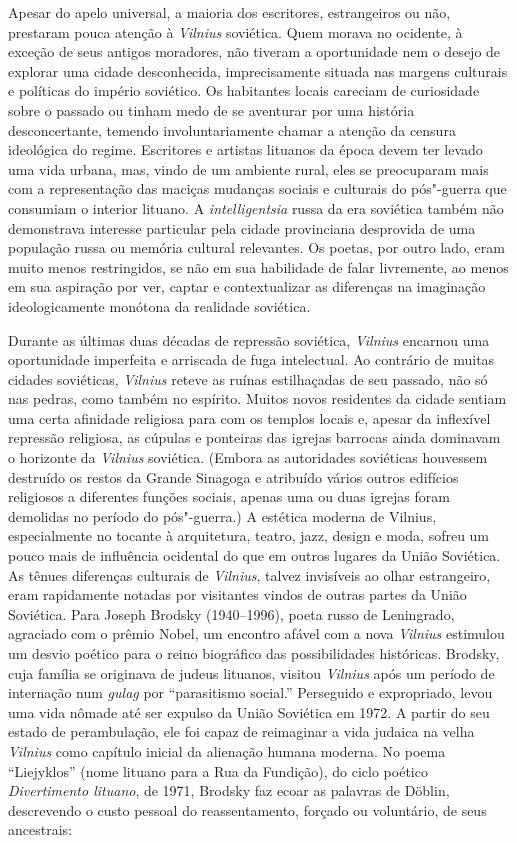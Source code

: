 Apesar do apelo universal, a maioria dos escritores, estrangeiros ou
não, prestaram pouca atenção à \textit{Vilnius} soviética. Quem morava no
ocidente, à exceção de seus antigos moradores, não tiveram a
oportunidade nem o desejo de explorar uma cidade desconhecida,
imprecisamente situada nas margens culturais e políticas do império
soviético. Os habitantes locais careciam de curiosidade sobre o passado
ou tinham medo de se aventurar por uma história desconcertante, temendo
involuntariamente chamar a atenção da censura ideológica do regime.
Escritores e artistas lituanos da época devem ter levado uma vida
urbana, mas, vindo de um ambiente rural, eles se preocuparam mais com a
representação das maciças mudanças sociais e culturais do pós"-guerra que
consumiam o interior lituano. A \textit{intelligentsia} russa da era
soviética também não demonstrava interesse particular pela cidade
provinciana desprovida de uma população russa ou memória cultural
relevantes. Os poetas, por outro lado, eram muito menos restringidos, se
não em sua habilidade de falar livremente, ao menos em sua aspiração por
ver, captar e contextualizar as diferenças na imaginação ideologicamente
monótona da realidade soviética.

Durante as últimas duas décadas de repressão soviética, \textit{Vilnius} encarnou
uma oportunidade imperfeita e arriscada de fuga intelectual. Ao
contrário de muitas cidades soviéticas, \textit{Vilnius} reteve as ruínas
estilhaçadas de seu passado, não só nas pedras, como também no espírito.
Muitos novos residentes da cidade sentiam uma certa afinidade religiosa
para com os templos locais e, apesar da inflexível repressão religiosa,
as cúpulas e ponteiras das igrejas barrocas ainda dominavam o horizonte
da \textit{Vilnius} soviética. (Embora as autoridades soviéticas houvessem
destruído os restos da Grande Sinagoga e atribuído vários outros
edifícios religiosos a diferentes funções sociais, apenas uma ou duas
igrejas foram demolidas no período do pós"-guerra.) A estética moderna de
Vilnius, especialmente no tocante à arquitetura, teatro, jazz, design e
moda, sofreu um pouco mais de influência ocidental do que em outros
lugares da União Soviética. As tênues diferenças culturais de \textit{Vilnius},
talvez invisíveis ao olhar estrangeiro, eram rapidamente notadas por
visitantes vindos de outras partes da União Soviética. Para Joseph
Brodsky (1940--1996), poeta russo de Leningrado, agraciado com o prêmio
Nobel, um encontro afável com a nova \textit{Vilnius} estimulou um desvio poético
para o reino biográfico das possibilidades históricas. Brodsky, cuja
família se originava de judeus lituanos, visitou \textit{Vilnius} após um período
de internação num \textit{gulag} por ``parasitismo social.'' Perseguido e
expropriado, levou uma vida nômade até ser expulso da União Soviética em
1972. A partir do seu estado de perambulação, ele foi capaz de
reimaginar a vida judaica na velha \textit{Vilnius} como capítulo inicial da
alienação humana moderna. No poema ``Liejyklos'' (nome lituano para a
Rua da Fundição), do ciclo poético \textit{Divertimento lituano}, de 1971,
Brodsky faz ecoar as palavras de Döblin, descrevendo o custo pessoal do
reassentamento, forçado ou voluntário, de seus ancestrais:

